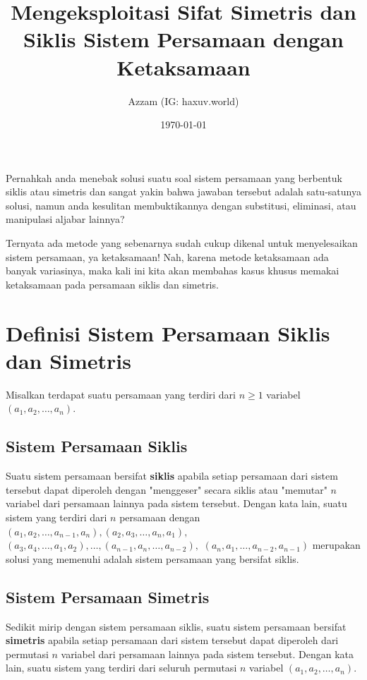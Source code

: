 \documentclass[12pt]{scrartcl}
\title{Mengeksploitasi Sifat Simetris dan Siklis Sistem Persamaan dengan Ketaksamaan}
\author{Azzam (IG: haxuv.world)}
\date{\today}
\begin{document}
\maketitle

\renewcommand*\contentsname{Daftar Isi}
\tableofcontents

\newpage

Pernahkah anda menebak solusi suatu soal sistem persamaan yang berbentuk siklis atau simetris dan sangat yakin bahwa jawaban tersebut adalah satu-satunya solusi, namun anda kesulitan membuktikannya dengan substitusi, eliminasi, atau manipulasi aljabar lainnya?

Ternyata ada metode yang sebenarnya sudah cukup dikenal untuk menyelesaikan sistem persamaan, ya ketaksamaan! Nah, karena metode ketaksamaan ada banyak variasinya, maka kali ini kita akan membahas kasus khusus memakai ketaksamaan pada persamaan siklis dan simetris.


\section{Definisi Sistem Persamaan Siklis dan Simetris}
Misalkan terdapat suatu persamaan yang terdiri dari $n \ge 1$ variabel $(a_1, a_2, \dots, a_n)$.

\subsection{Sistem Persamaan Siklis}
Suatu sistem persamaan bersifat \textbf{siklis} apabila setiap persamaan dari sistem tersebut dapat diperoleh dengan "menggeser" secara siklis atau "memutar" $n$ variabel dari persamaan lainnya pada sistem tersebut. Dengan kata lain, suatu sistem yang terdiri dari $n$ persamaan dengan $(a_1, a_2, \dots,a_{n-1}, a_n), (a_2, a_3, \dots, a_n, a_1),$
$ (a_3, a_4, \dots, a_1, a_2), \dots,(a_{n-1}, a_{n}, \dots, a_{n-2}),$
$(a_n, a_1, \dots, a_{n-2}, a_{n-1})$ merupakan solusi yang memenuhi adalah sistem persamaan yang bersifat siklis.
\vspace{2mm}
\subsection{Sistem Persamaan Simetris}
Sedikit mirip dengan sistem persamaan siklis, suatu sistem persamaan bersifat \textbf{simetris} apabila setiap persamaan dari sistem tersebut dapat diperoleh dari permutasi $n$ variabel dari persamaan lainnya pada sistem tersebut. Dengan kata lain, suatu sistem yang terdiri dari seluruh permutasi $n$ variabel $(a_1, a_2, \dots, a_n)$.
\end{document}
